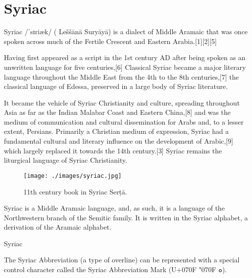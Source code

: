 \section{Syriac}
\label{s:syriac}
\newfontfamily{}

Syriac /ˈsɪriæk/ ({} Leššānā Suryāyā) is a dialect of Middle Aramaic that was once spoken across much of the Fertile Crescent and Eastern Arabia.[1][2][5] 

Having first appeared as a script in the 1st century AD after being spoken as an unwritten language for five centuries,[6] Classical Syriac became a major literary language throughout the Middle East from the 4th to the 8th centuries,[7] the classical language of Edessa, preserved in a large body of Syriac literature.


It became the vehicle of Syriac Christianity and culture, spreading throughout Asia as far as the Indian Malabar Coast and Eastern China,[8] and was the medium of communication and cultural dissemination for Arabs and, to a lesser extent, Persians. Primarily a Christian medium of expression, Syriac had a fundamental cultural and literary influence on the development of Arabic,[9] which largely replaced it towards the 14th century.[3] Syriac remains the liturgical language of Syriac Christianity.

\begin{figure}[htb]
\centering
\texttt{[image: ./images/syriac.jpg]}
\caption{11th century book in Syriac Serṭā.}
\end{figure}

Syriac is a Middle Aramaic language, and, as such, it is a language of the Northwestern branch of the Semitic family. It is written in the Syriac alphabet, a derivation of the Aramaic alphabet.

\begin{scriptexample}[]{Syriac}
\end{scriptexample}

The Syriac Abbreviation (a type of overline) can be represented with a special control character called the Syriac Abbreviation Mark (U+070F {\syriac \char"070F ܘ}).


^^A



